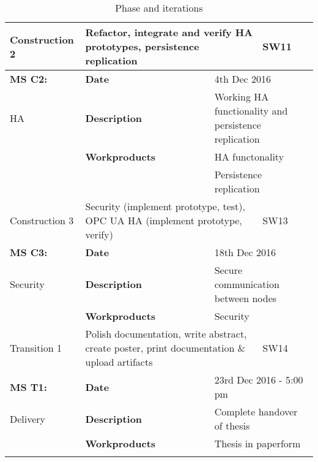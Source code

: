 \begin{center}
\begin{longtable}{ | p{25mm} | p{25mm} p{35mm}| p{5mm} | }
	Construction 2
	& \multicolumn{2}{l|}{Refactor, integrate and verify HA prototypes, persistence replication}
	& SW11 \\ \hline
	\textbf{MS C2:}
	& \textbf{Date}
	& \multicolumn{2}{l|}{4th Dec 2016} \\
	HA & \textbf{Description}
	& \multicolumn{2}{l|}{Working HA functionality and persistence replication} \\
	& \textbf{Workproducts}
	& \multicolumn{2}{l|}{HA functonality} \\
	& & \multicolumn{2}{l|}{Persistence replication} \\ \hline
	Construction 3
	& \multicolumn{2}{p{70mm}|}{Security (implement prototype, test), OPC UA HA (implement prototype, verify)}
	& SW13 \\ \hline
	\textbf{MS C3:}
	& \textbf{Date}
	& \multicolumn{2}{l|}{18th Dec 2016} \\
	Security & \textbf{Description}
	& \multicolumn{2}{l|}{Secure communication between nodes} \\
	& \textbf{Workproducts}
	& \multicolumn{2}{l|}{Security} \\
	\hline
	\hline

	Transition 1
	& \multicolumn{2}{p{70mm}|}{Polish documentation, write abstract, create poster, print documentation \& upload artifacts}
	& SW14 \\ \hline
	\textbf{MS T1:}
	& \textbf{Date}
	& \multicolumn{2}{l|}{23rd Dec 2016 - 5:00 pm} \\
	Delivery & \textbf{Description}
	& \multicolumn{2}{l|}{Complete handover of thesis} \\
	& \textbf{Workproducts}
	& \multicolumn{2}{l|}{Thesis in paperform} \\
	\hline
	\hline

   \caption{Phase and iterations} \label{tab:phases}
   \end{longtable}
\end{center}
